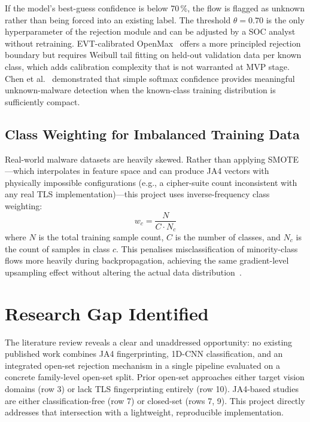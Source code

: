 \documentclass[12pt,a4paper]{report}
\begin{document}
If the model's best-guess confidence is below 70\,\%, the flow is flagged as
unknown rather than being forced into an existing label. The threshold $\theta = 0.70$
is the only hyperparameter of the rejection module and can be adjusted by a SOC
analyst without retraining. EVT-calibrated OpenMax~\cite{bendale2016openmax}
offers a more principled rejection boundary but requires Weibull tail fitting on
held-out validation data per known class, which adds calibration complexity that
is not warranted at MVP stage. Chen et al.~\cite{opensetmalware2023} demonstrated
that simple softmax confidence provides meaningful unknown-malware detection when
the known-class training distribution is sufficiently compact.

\subsection{Class Weighting for Imbalanced Training Data}

Real-world malware datasets are heavily skewed. Rather than applying SMOTE---which
interpolates in feature space and can produce JA4 vectors with physically impossible
configurations (e.g., a cipher-suite count inconsistent with any real TLS
implementation)---this project uses inverse-frequency class weighting:
\begin{equation}
  w_c = \frac{N}{C \cdot N_c}
\end{equation}
where $N$ is the total training sample count, $C$ is the number of classes, and
$N_c$ is the count of samples in class $c$. This penalises misclassification of
minority-class flows more heavily during backpropagation, achieving the same
gradient-level upsampling effect without altering the actual data
distribution~\cite{groupreweight2024}.

\section{Research Gap Identified}

The literature review reveals a clear and unaddressed opportunity: no existing
published work combines JA4 fingerprinting, 1D-CNN classification, and an
integrated open-set rejection mechanism in a single pipeline evaluated on a
concrete family-level open-set split. Prior open-set approaches either target
vision domains (row 3) or lack TLS fingerprinting entirely (row 10).
JA4-based studies are either classification-free (row 7) or closed-set
(rows 7, 9). This project directly addresses that intersection with a lightweight,
reproducible implementation.
\end{document}
